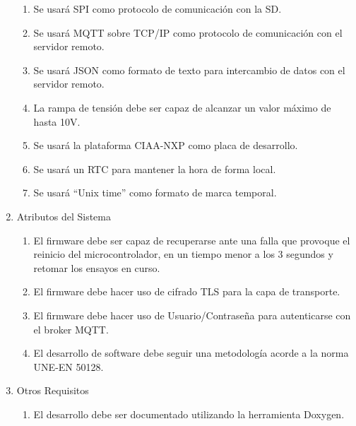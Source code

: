 \documentclass[11pt]{charter}
\begin{document}
\begin{enumerate}
\begin{enumerate}
	\item Se usará SPI como protocolo de comunicación con la SD.
	\item Se usará MQTT sobre TCP/IP como protocolo de comunicación con el servidor remoto.
	\item Se usará JSON como formato de texto para intercambio de datos con el servidor remoto.
	\item La rampa de tensión debe ser capaz de alcanzar un valor máximo de hasta 10V.
	\item Se usará la plataforma CIAA-NXP como placa de desarrollo.
	\item Se usará un RTC para mantener la hora de forma local.
	\item Se usará ``Unix time'' como formato de marca temporal. 
	\end{enumerate}
\item Atributos del Sistema
	\begin{enumerate}
	\item El firmware debe ser capaz de recuperarse ante una falla que provoque el reinicio del microcontrolador, en un tiempo menor a los 3 segundos y retomar los ensayos en curso.
	\item El firmware debe hacer uso de cifrado TLS para la capa de transporte.
	\item El firmware debe hacer uso de Usuario/Contraseña para autenticarse con el broker MQTT.
	\item El desarrollo de software debe seguir una metodología acorde a la norma UNE-EN 50128.
	\end{enumerate}
\item Otros Requisitos
	\begin{enumerate}
	\item El desarrollo debe ser documentado utilizando la herramienta Doxygen.
	\end{enumerate}
\end{enumerate}
\end{document}
